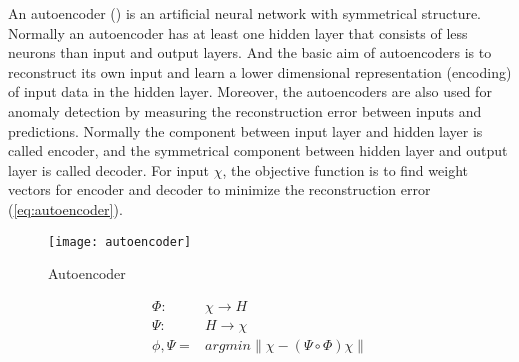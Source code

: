 An autoencoder () is an artificial neural network with symmetrical structure. Normally an autoencoder has at least one hidden layer that consists of less neurons than input and output layers. And the basic aim of autoencoders is to reconstruct its own input and learn a lower dimensional representation (encoding) of input data in the hidden layer. Moreover, the autoencoders are also used for anomaly detection by measuring the reconstruction error between inputs and predictions.
Normally the component between input layer and hidden layer is called encoder, and the symmetrical component between hidden layer and output layer is called decoder. For input $\chi$, the objective function is to find weight vectors for encoder and decoder to minimize the reconstruction error (\ref{eq:autoencoder}).

\begin{figure}[h]
\centering
\texttt{[image: autoencoder]}
\caption[Autoencoder]{Autoencoder}
\label{fig:autoencoder}
\end{figure}

\begin{equation} \label{eq:autoencoder}
\begin{aligned}
\Phi : &\chi \rightarrow H \\
\Psi : &H \rightarrow \chi \\
\phi, \Psi = &argmin \left \| \chi-(\Psi \circ \Phi)\chi \right \| 
\end{aligned}
\end{equation}

